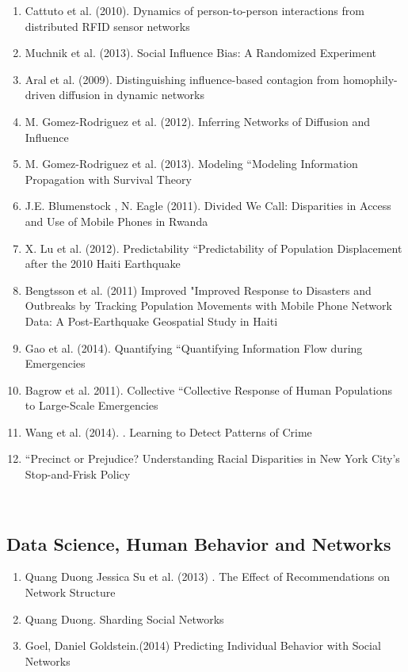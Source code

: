 \begin{enumerate}
\item Cattuto et al. (2010).  Dynamics of person-to-person interactions from distributed RFID sensor networks\cite{Cattuto_2010}   
\item Muchnik et al. (2013).  Social Influence Bias: A Randomized Experiment\cite{Muchnik_2013}  
\item Aral et al. (2009).  Distinguishing influence-based contagion from homophily-driven diffusion in dynamic networks\cite{Aral_2009}   
\item M. Gomez-Rodriguez et al. (2012).  Inferring Networks of Diffusion and Influence\cite{Gomez_Rodriguez_2012}   
\item  M. Gomez-Rodriguez et al. (2013). Modeling “Modeling  Information Propagation with Survival Theory\cite{rodriguez2013modeling} 
\item J.E. Blumenstock , N. Eagle (2011).  Divided We Call: Disparities in Access and Use of Mobile Phones in Rwanda\cite{blumenstock2012divided}   
\item  X. Lu et al. (2012). Predictability “Predictability  of Population Displacement after the 2010 Haiti Earthquake\cite{Lu_2012}   
\item  Bengtsson et al. (2011) Improved "Improved  Response to Disasters and Outbreaks by Tracking Population Movements with Mobile Phone Network Data: A Post-Earthquake Geospatial Study in Haiti\cite{Bengtsson_2011}  
\item  Gao et al. (2014). Quantifying “Quantifying  Information Flow during Emergencies\cite{Gao_2014}   
\item  Bagrow et al. 2011). Collective “Collective  Response of Human Populations to Large-Scale Emergencies\cite{Bagrow_2011}  \item  Wang et al. (2014). .  Learning to Detect Patterns of Crime\cite{Wang_2013}   
\item  “Precinct or Prejudice? Understanding Racial Disparities in New York City’s Stop-and-Frisk Policy  \end{enumerate}  \\  \subsection{Data Science, Human Behavior and Networks}  \begin{enumerate}  
\item  Quang Duong Jessica Su  et al. (2013) . The Effect of Recommendations on Network Structure   
\item  Quang Duong.  Sharding Social Networks\cite{Duong_2013}   
\item  Goel, Daniel  Goldstein.(2014)  Predicting Individual Behavior with Social Networks \cite{Goel_2014} 


\end{enumerate}  
\\  
